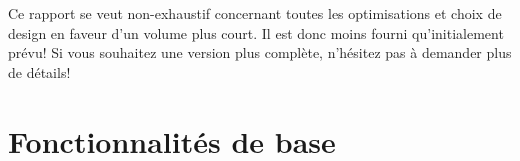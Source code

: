 \documentclass{scrreprt}
\begin{document}
    \begin{info}
        Ce rapport se veut non-exhaustif concernant toutes les optimisations et
        choix de design en faveur d'un volume plus court. Il est donc moins
        fourni qu'initialement prévu! Si vous souhaitez une version plus
        complète, n'hésitez pas à demander plus de détails!
    \end{info}


    \part{Fonctionnalités de base}








\end{document}
